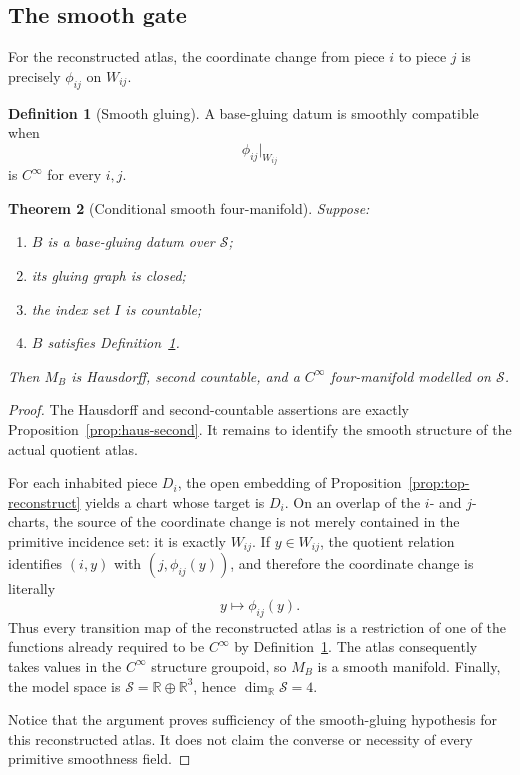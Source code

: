 \documentclass[11pt,a4paper]{article}
\newtheorem{theorem}{Theorem}[section]
\theoremstyle{definition}
\newtheorem{definition}[theorem]{Definition}
\theoremstyle{remark}
\newcommand{\R}{\mathbb{R}}
\newcommand{\Smodel}{\mathcal{S}}
\begin{document}
\subsection{The smooth gate}

For the reconstructed atlas, the coordinate change from piece \(i\) to
piece \(j\) is precisely \(\phi_{ij}\) on \(W_{ij}\).

\begin{definition}[Smooth gluing]
\label{def:smoothgluing}
A base-gluing datum is smoothly compatible when
\[
   \phi_{ij}|_{W_{ij}}
\]
is \(C^\infty\) for every \(i,j\).
\end{definition}

\begin{theorem}[Conditional smooth four-manifold]
\label{thm:smooth-manifold}
Suppose:
\begin{enumerate}
\item \(B\) is a base-gluing datum over \(\Smodel\);
\item its gluing graph is closed;
\item the index set \(I\) is countable;
\item \(B\) satisfies Definition~\ref{def:smoothgluing}.
\end{enumerate}
Then \(M_B\) is Hausdorff, second countable, and a \(C^\infty\)
four-manifold modelled on \(\Smodel\).
\end{theorem}

\begin{proof}
The Hausdorff and second-countable assertions are exactly
Proposition~\ref{prop:haus-second}.  It remains to identify the smooth structure of
the actual quotient atlas.

For each inhabited piece \(D_i\), the open embedding of
Proposition~\ref{prop:top-reconstruct} yields a chart whose target is \(D_i\).  On an
overlap of the \(i\)- and \(j\)-charts, the source of the coordinate change
is not merely contained in the primitive incidence set: it is exactly
\(W_{ij}\).  If \(y\in W_{ij}\), the quotient relation identifies
\((i,y)\) with \((j,\phi_{ij}(y))\), and therefore the coordinate change is
literally
\[
     y\longmapsto\phi_{ij}(y).
\]
Thus every transition map of the reconstructed atlas is a restriction of
one of the functions already required to be \(C^\infty\) by
Definition~\ref{def:smoothgluing}.  The atlas consequently takes values in the
\(C^\infty\) structure groupoid, so \(M_B\) is a smooth manifold.
Finally, the model space is
\(\Smodel=\R\oplus\R^3\), hence \(\dim_{\R}\Smodel=4\).

Notice that the argument proves sufficiency of the smooth-gluing
hypothesis for this reconstructed atlas.  It does not claim the converse or
necessity of every primitive smoothness field.
\end{proof}
\end{document}

